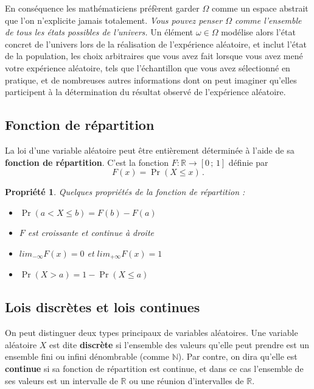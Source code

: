 \documentclass[12pt, a4paper]{book}
\newtheorem{prop}[thm]{Propriété}
\numberwithin{equation}{section}
\newcommand{\N}{{\mathbb N}}
\newcommand{\R}{{\mathbb R}}
\begin{document}
En conséquence les mathématiciens préfèrent garder $\Omega$ comme un espace abstrait que l'on n'explicite jamais totalement. \emph{Vous pouvez penser $\Omega$ comme l'ensemble de tous les états possibles de l'univers.} Un élément $\omega\in\Omega$ modélise alors l'état concret de l'univers lors de la réalisation de l'expérience aléatoire, et inclut l'état de la population, les choix arbitraires que vous avez fait lorsque vous avez mené votre expérience aléatoire, tels que l'échantillon que vous avez sélectionné en pratique, et de nombreuses autres informations dont on peut imaginer qu'elles participent à la détermination du résultat observé de l'expérience aléatoire.

\subsection{Fonction de répartition}

La loi d'une variable aléatoire peut être entièrement déterminée à l'aide de sa {\bf fonction de répartition}. C'est la fonction 
$F:\mathbb{R}\longrightarrow [0\,;\,1]$ définie par
$$
F(x)=\Pr(X\leq x)\,.
$$

\begin{prop}
Quelques propriétés de la fonction de répartition :
\begin{itemize}
\item $\Pr(a<X\leq b)=F(b)-F(a)$
\item $F$ est croissante et continue à droite
\item $\displaystyle lim_{-\infty} F(x)=0$ et $\displaystyle lim_{+\infty} F(x)=1$
\item $\Pr(X>a)=1-\Pr(X\leq a)$\\
\end{itemize}
\end{prop}

\subsection{Lois discrètes et lois continues}

On peut distinguer deux types principaux de variables aléatoires. Une variable aléatoire $X$ est dite {\bf discrète} si l'ensemble des 
valeurs qu'elle peut prendre est un ensemble fini ou infini dénombrable (comme $\mathbb{\N}$). Par contre, on dira qu'elle est {\bf continue} si sa fonction de répartition est continue, et dans ce cas l'ensemble de ses valeurs est un intervalle de $\mathbb{R}$ ou une réunion d'intervalles de $\R$.
\end{document}
